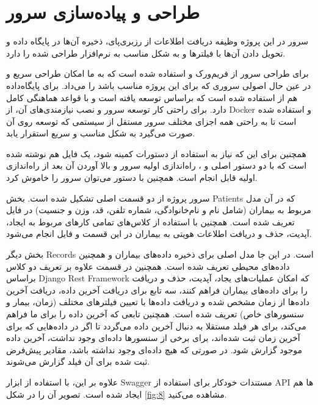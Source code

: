\section{طراحی و پیاده‌سازی سرور}

سرور در این پروژه وظیفه دریافت اطلاعات از رزبری‌پای،‌ ذخیره آن‌ها در پایگاه داده و تحویل دادن آن‌ها با فیلترها و به شکل مناسب به نرم‌افزار طراحی شده را دارد.

برای طراحی سرور از فریم‌ورک  و  استفاده شده است که به ما امکان طراحی سریع و در عین حال اصولی  سروری که برای این پروژه مناسب باشد را می‌داد. برای پایگاه‌داده هم از  استفاده شده است که براساس  توسعه یافته است و با قواعد  هماهنگی کامل دارد. برای راحتی کار توسعه سرور و نصب نیازمندی‌های آن، از Docker و  استفاده شده است تا به راحتی همه اجزای مختلف سرور مستقل از سیستمی که توسعه روی آن صورت می‌گیرد به شکل مناسب و سریع استقرار یابد.

\lr{}همچنین برای این که نیاز به استفاده از دستورات  کمینه شود، یک فایل   هم نوشته شده است که با دو دستور اصلی  و ، راه‌اندازی اولیه سرور و بالا آوردن آن بعد از راه‌اندازی اولیه قابل انجام است. همچنین با دستور  می‌توان سرور را خاموش کرد.



سرور پروژه از دو قسمت اصلی تشکیل شده است. بخش Patients که در آن مدل مربوط به بیماران (شامل نام و نام‌خانوادگی،‌ شماره تلفن، قد، وزن و جنسیت) در فایل  تعریف شده است. همچنین با استفاده از کلاس‌های  تمامی کار‌های مربوط به ایجاد، آپدیت، حذف و دریافت اطلاعات هویتی به بیماران در این قسمت و فایل  انجام می‌شود.

بخش دیگر Records است. در این جا مدل اصلی برای ذخیره داده‌های بیماران و همچنین داده‌های محیطی تعریف شده است. همچنین در قسمت  علاوه بر تعریف دو کلاس براساس Django Rest Framework که امکان عملیات‌های یجاد، آپدیت، حذف و دریافت را برای داده‌های بیماران فراهم کنند، سه تابع برای دریافت آخرین داده، دریافت آخرین داده‌ها از زمان مشخص شده و دریافت داده‌ها با تعیین فیلتر‌های مختلف (زمان، بیمار و سنسورهای خاص) تعریف شده است. همچنین تابعی که آخرین داده را برای ما فراهم می‌کند، برای هر فیلد مستقلا به دنبال آخرین داده می‌گردد تا اگر در داده‌هایی که برای آخرین زمان ثبت شده‌اند، برای برخی از سنسورها داده‌ای وجود نداشت، آخرین داده موجود گزارش شود. در صورتی که هیچ داده‌ای وجود نداشته باشد، مقادیر پیش‌فرض ثبت شده برای آن فیلد گزارش می‌شوند.

علاوه بر این، با استفاده از ابزار Swagger مستندات خودکار برای استفاده از API ها هم ایجاد شده است. تصویر آن را در شکل \ref{fig:8}
مشاهده می‌کنید.

